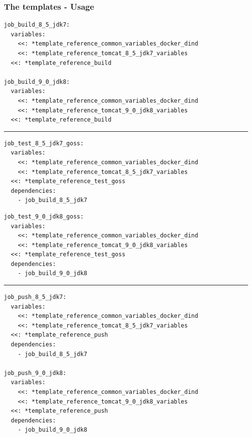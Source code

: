 \documentclass[14pt,aspectratio=169]{beamer}
\begin{document}
\begin{frame}
  \frametitle{The templates - Usage}

  \begin{multicols}{2}
    \begin{verbatim}
job_build_8_5_jdk7:
  variables:
    <<: *template_reference_common_variables_docker_dind
    <<: *template_reference_tomcat_8_5_jdk7_variables
  <<: *template_reference_build

job_build_9_0_jdk8:
  variables:
    <<: *template_reference_common_variables_docker_dind
    <<: *template_reference_tomcat_9_0_jdk8_variables
  <<: *template_reference_build
    \end{verbatim}
    \hrule
    \begin{verbatim}
job_test_8_5_jdk7_goss:
  variables:
    <<: *template_reference_common_variables_docker_dind
    <<: *template_reference_tomcat_8_5_jdk7_variables
  <<: *template_reference_test_goss
  dependencies:
    - job_build_8_5_jdk7
    \end{verbatim}
    \vfill\null
    \columnbreak
    \begin{verbatim}
job_test_9_0_jdk8_goss:
  variables:
    <<: *template_reference_common_variables_docker_dind
    <<: *template_reference_tomcat_9_0_jdk8_variables
  <<: *template_reference_test_goss
  dependencies:
    - job_build_9_0_jdk8
    \end{verbatim}
    \hrule
    \begin{verbatim}
job_push_8_5_jdk7:
  variables:
    <<: *template_reference_common_variables_docker_dind
    <<: *template_reference_tomcat_8_5_jdk7_variables
  <<: *template_reference_push
  dependencies:
    - job_build_8_5_jdk7

job_push_9_0_jdk8:
  variables:
    <<: *template_reference_common_variables_docker_dind
    <<: *template_reference_tomcat_9_0_jdk8_variables
  <<: *template_reference_push
  dependencies:
    - job_build_9_0_jdk8
    \end{verbatim}
  \end{multicols}
\end{frame}

\subsection{}
\end{document}

